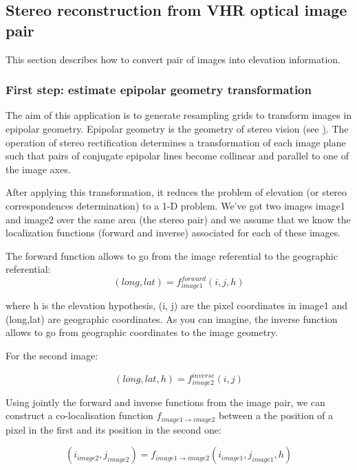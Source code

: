 \subsection{Stereo reconstruction from VHR optical image pair}\label{sec:stereoreconstruction}

This section describes how to convert pair of images into elevation information.

\subsubsection{First step: estimate epipolar geometry transformation}\label{ssec:epipolar}
The aim of this application is to generate resampling grids to transform images
in epipolar geometry.  Epipolar geometry is the geometry of stereo vision (see
\href{http://en.wikipedia.org/wiki/Epipolar_geometry}). The operation of stereo
rectification determines a transformation of each image plane such that pairs of
conjugate epipolar lines become collinear and parallel to one of the image axes.

After applying this transformation, it reduces the problem of elevation (or
stereo correspondences determination) to a 1-D problem.  We've got two images
image1 and image2 over the same area (the stereo pair) and we assume that we
know the localization functions (forward and inverse) associated for each of
these images.

The forward function allows to go from the image referential to the geographic
referential:
\begin{equation}
  (long,lat) = f^{forward}_{image1}(i,j,h)
\end{equation}

where h is the elevation hypothesis, (i, j) are the pixel coordinates in image1
and (long,lat) are geographic coordinates.  As you can imagine, the inverse
function allows to go from geographic coordinates to the image geometry.

For the second image:

\begin{equation}
   (long,lat,h) = f^{inverse}_{image2}(i,j)
\end{equation}

Using jointly the forward and inverse functions from the image pair, we can
construct a co-localisation function $f_{image1 \rightarrow image2}$ between a
the position of a pixel in the first and its position in the second one:

\begin{equation}
(i_{image2},j_{image2}) = f_{image1 \rightarrow image2} (i_{image1} , j_{image1} , h)
\end{equation}

